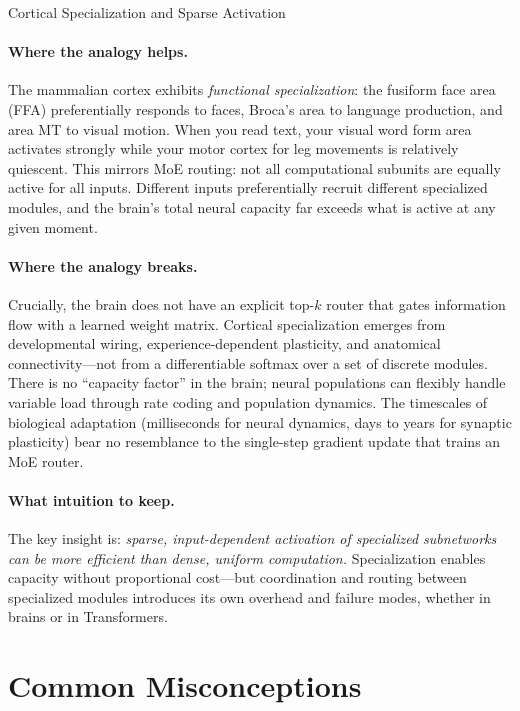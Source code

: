 \begin{analogybox}{Cortical Specialization and Sparse Activation}
  \paragraph{Where the analogy helps.}
  The mammalian cortex exhibits \emph{functional specialization}: the fusiform face area (FFA) preferentially responds to faces, Broca's area to language production, and area MT to visual motion. When you read text, your visual word form area activates strongly while your motor cortex for leg movements is relatively quiescent. This mirrors MoE routing: not all computational subunits are equally active for all inputs. Different inputs preferentially recruit different specialized modules, and the brain's total neural capacity far exceeds what is active at any given moment.

  \paragraph{Where the analogy breaks.}
  Crucially, the brain does not have an explicit top-$k$ router that gates information flow with a learned weight matrix. Cortical specialization emerges from developmental wiring, experience-dependent plasticity, and anatomical connectivity---not from a differentiable softmax over a set of discrete modules. There is no ``capacity factor'' in the brain; neural populations can flexibly handle variable load through rate coding and population dynamics. The timescales of biological adaptation (milliseconds for neural dynamics, days to years for synaptic plasticity) bear no resemblance to the single-step gradient update that trains an MoE router.

  \paragraph{What intuition to keep.}
  The key insight is: \emph{sparse, input-dependent activation of specialized subnetworks can be more efficient than dense, uniform computation.} Specialization enables capacity without proportional cost---but coordination and routing between specialized modules introduces its own overhead and failure modes, whether in brains or in Transformers.
\end{analogybox}


\section{Common Misconceptions}
\label{ch:13:sec:misconceptions}

